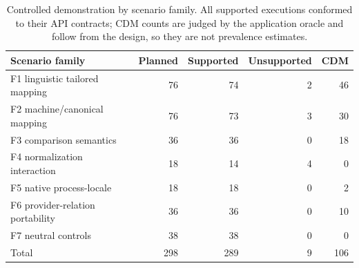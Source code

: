 \begin{table}[t]
\centering
\small
\caption{Controlled demonstration by scenario family. All supported executions conformed to their API contracts; CDM counts are judged by the application oracle and follow from the design, so they are not prevalence estimates.}
\label{tab:rq1}
\begin{tabular}{@{}lrrrr@{}}
\toprule
Scenario family & Planned & Supported & Unsupported & CDM \\
\midrule
F1 linguistic tailored mapping & 76 & 74 & 2 & 46 \\
F2 machine/canonical mapping & 76 & 73 & 3 & 30 \\
F3 comparison semantics & 36 & 36 & 0 & 18 \\
F4 normalization interaction & 18 & 14 & 4 & 0 \\
F5 native process-locale & 18 & 18 & 0 & 2 \\
F6 provider-relation portability & 36 & 36 & 0 & 10 \\
F7 neutral controls & 38 & 38 & 0 & 0 \\
\midrule
Total & 298 & 289 & 9 & 106 \\
\bottomrule
\end{tabular}
\end{table}
